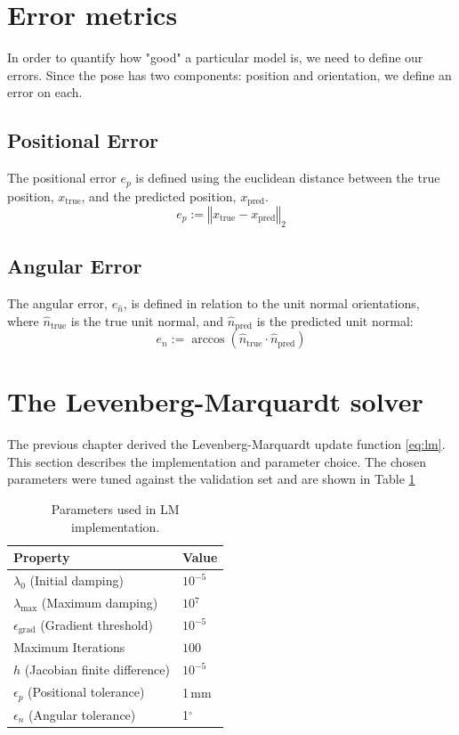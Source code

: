 \section{Error metrics}\label{sec:error}
In order to quantify how "good" a particular model is, we need to define our errors. Since the pose has two components: position and orientation, we define an error on each. 

\subsection{Positional Error}
The positional error $e_p$ is defined using the euclidean distance between the true position, $x_\mathrm{true}$, and the predicted position, $x_\mathrm{pred}$.
\begin{equation}
  e_{p} := \left\Vert x_\mathrm{true} - x_\mathrm{pred} \right\Vert_2
\end{equation}

\subsection{Angular Error}
The angular error, $e_{\hat{n}}$, is defined in relation to the unit normal orientations, where $\hat{n}_\mathrm{true}$ is the true unit normal, and $\hat{n}_\mathrm{pred}$ is the predicted unit normal:
\begin{equation}
  e_{\hat{n}} := \arccos \left( \hat{n}_\mathrm{true} \cdot \hat{n}_\mathrm{pred} \right)
\end{equation}

\section{The Levenberg-Marquardt solver}\label{sec:methods-lm}
The previous chapter derived the Levenberg-Marquardt update function \eqref{eq:lm}. This section describes the implementation and parameter choice. The chosen parameters were tuned against the validation set and are shown in Table \ref{tab:lm_parameters} 

\begin{table}
  \centering
  \begin{tabular}{ll}
    \toprule
    Property & Value \\
    \midrule
    $\lambda_0$ (Initial damping) & $10^{-5}$ \\
    $\lambda_{\max}$ (Maximum damping) & $10{^7}$ \\
    $\epsilon_{\mathrm{grad}}$ (Gradient threshold) & $10^{-5}$ \\
    Maximum Iterations & $100$ \\
    $h$ (Jacobian finite difference) & $10^{-5}$ \\
    $\epsilon_p$ (Positional tolerance) & 1\,mm \\
    $\epsilon_n$ (Angular tolerance) & 1$^\circ$ \\
    \bottomrule
  \end{tabular}
  \caption{Parameters used in LM implementation.}
  \label{tab:lm_parameters}
\end{table}


